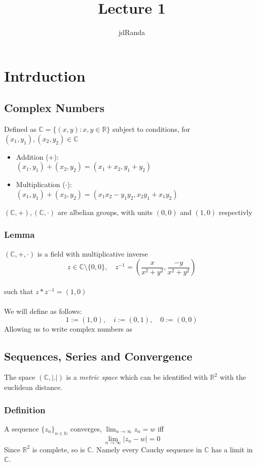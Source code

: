 \documentclass[a4paper, 12pt, twoside]{article}
\author{jdRanda}
\title{Lecture 1}
\begin{document}
    \section{Intrduction}
        \subsection{Complex Numbers}
            Defined as $ \mathbb{C} = \{ (x,y):x,y \in \mathbb{R} \} $
            subject to conditions,  for $(x_{1}, y_{1}), (x_{2}, y_{2}) \in \mathbb{C}$
            \begin{itemize}
                \item Addition ($+$):\\
                $ (x_{1}, y_{1}) + (x_{2}, y_{2}) = (x_{1}+x_{2}, y_{1}+y_{2})$
                \item Multiplication ($\cdot$):\\ $ (x_{1}, y_{1}) + (x_{2}, y_{2}) = (x_{1}x_{2}-y_{1}y_{2}, x_{2}y_{1}+x_{1}y_{2}) $
            \end{itemize}
            $(\mathbb{C},+), (\mathbb{C},\cdot)  $ are albelian groups, with units $(0,0)$ and $(1,0)$ respectivly
            \subsubsection{Lemma}
                $(\mathbb{C},+,\cdot) $ is a field with multiplicative inverse
                $$z \in \mathbb{C} \text{\textbackslash}  \{0,0\}, \quad z^{-1}=(\frac{x}{x^{2}+y^{2}},\frac{-y}{x^{2}+y^{2}})$$\\
                such that $z*z^{-1}=(1,0)$\\\\

            \noindent We will define as follows:
            $$ 1:=(1,0),\quad i:=(0,1),\quad 0:=(0,0) $$
            Allowing us to write complex numbers as


        \newpage
        \subsection{Sequences, Series and Convergence}
        The space $(\mathbb{C},|.|)$ is a \emph{metric space} which can be identified with $\mathbb{R}^{2}$ with the euclidean distance.
            \subsubsection{Definition}
            A sequence $\{z_{n}\}_{n\in \mathbb{N}}$ converges, $\lim_{n\to \infty}z_{n}=w$ iff
            $$\lim_{n\to \infty}|z_{n}-w|=0 $$
            Since $\mathbb{R}^{2}$ is complete, so is $\mathbb{C}$. Namely every Cauchy sequence in $\mathbb{C}$ has a limit in $\mathbb{C}$.
\end{document}
